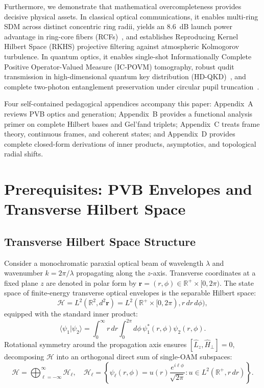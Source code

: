 \documentclass{optica-article}
\begin{document}
Furthermore, we demonstrate that mathematical overcompleteness provides decisive physical assets. In classical optical communications, it enables multi-ring SDM across distinct concentric ring radii, yields an 8.6~dB launch power advantage in ring-core fibers (RCFs)~\cite{Villalba2023}, and establishes Reproducing Kernel Hilbert Space (RKHS) projective filtering against atmospheric Kolmogorov turbulence. In quantum optics, it enables single-shot Informationally Complete Positive Operator-Valued Measure (IC-POVM) tomography, robust qudit transmission in high-dimensional quantum key distribution (HD-QKD)~\cite{Cerf2002,Mirhosseini2015}, and complete two-photon entanglement preservation under circular pupil truncation~\cite{Clauser1969}.

Four self-contained pedagogical appendices accompany this paper: Appendix~A reviews PVB optics and generation; Appendix~B provides a functional analysis primer on complete Hilbert bases and Gel'fand triplets; Appendix~C treats frame theory, continuous frames, and coherent states; and Appendix~D provides complete closed-form derivations of inner products, asymptotics, and topological radial shifts.

\section{Prerequisites: PVB Envelopes and Transverse Hilbert Space}
\label{sec:prerequisites}

\subsection{Transverse Hilbert Space Structure}

Consider a monochromatic paraxial optical beam of wavelength $\lambda$ and wavenumber $k = 2\pi / \lambda$ propagating along the $z$-axis. Transverse coordinates at a fixed plane $z$ are denoted in polar form by $\mathbf{r} = (r, \phi) \in \mathbb{R}^+ \times [0, 2\pi)$. The state space of finite-energy transverse optical envelopes is the separable Hilbert space:
\begin{equation}
\mathcal{H} = L^2(\mathbb{R}^2, d^2\mathbf{r}) = L^2(\mathbb{R}^+ \times [0, 2\pi), r \, dr \, d\phi),
\end{equation}
equipped with the standard inner product:
\begin{equation}
\langle \psi_1 | \psi_2 \rangle = \int_0^\infty r \, dr \int_0^{2\pi} d\phi \, \psi_1^*(r, \phi) \psi_2(r, \phi).
\end{equation}
Rotational symmetry around the propagation axis ensures $[\hat{L}_z, \hat{H}_\perp] = 0$, decomposing $\mathcal{H}$ into an orthogonal direct sum of single-OAM subspaces:
\begin{equation}
\mathcal{H} = \bigoplus_{\ell=-\infty}^\infty \mathcal{H}_\ell, \quad \mathcal{H}_\ell = \left\{ \psi_\ell(r, \phi) = u(r) \frac{e^{i \ell \phi}}{\sqrt{2\pi}} : u \in L^2(\mathbb{R}^+, r \, dr) \right\}.
\end{equation}
\end{document}
